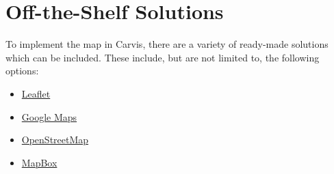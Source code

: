 \chapter{Off-the-Shelf Solutions}
To implement the map in Carvis, there are a variety of ready-made solutions which can be included.
These include, but are not limited to, the following options:
\begin{itemize}
    \item \href{https://leafletjs.com/}{Leaflet}
    \item \href{https://developers.google.com/maps/apis-by-platform}{Google Maps}
    \item \href{https://wiki.openstreetmap.org/wiki/API_v0.6}{OpenStreetMap}
    \item \href{https://www.mapbox.com/}{MapBox}
\end{itemize} 